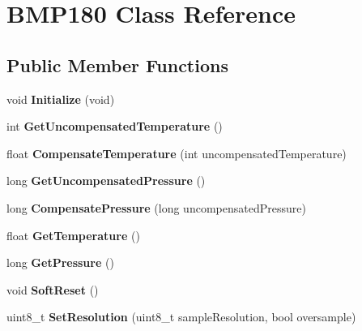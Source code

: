 \hypertarget{class_b_m_p180}{}\section{B\+M\+P180 Class Reference}
\label{class_b_m_p180}
\subsection*{Public Member Functions}
\begin{DoxyCompactItemize}
\item 
\hypertarget{class_b_m_p180_aa0d204ff14f242e7dae7f17616f384b5}{}void {\bfseries Initialize} (void)\label{class_b_m_p180_aa0d204ff14f242e7dae7f17616f384b5}

\item 
\hypertarget{class_b_m_p180_a25efcc78a47f50bb416252dd6589c5b2}{}int {\bfseries Get\+Uncompensated\+Temperature} ()\label{class_b_m_p180_a25efcc78a47f50bb416252dd6589c5b2}

\item 
\hypertarget{class_b_m_p180_aaa9d85bd4b3e01ed5f8145672ebd11b0}{}float {\bfseries Compensate\+Temperature} (int uncompensated\+Temperature)\label{class_b_m_p180_aaa9d85bd4b3e01ed5f8145672ebd11b0}

\item 
\hypertarget{class_b_m_p180_aeffb6785b31ee9cc4c22e66341d61985}{}long {\bfseries Get\+Uncompensated\+Pressure} ()\label{class_b_m_p180_aeffb6785b31ee9cc4c22e66341d61985}

\item 
\hypertarget{class_b_m_p180_a0a6ea646db93f926d7883f2c48d69f90}{}long {\bfseries Compensate\+Pressure} (long uncompensated\+Pressure)\label{class_b_m_p180_a0a6ea646db93f926d7883f2c48d69f90}

\item 
\hypertarget{class_b_m_p180_a57b06b78699af8789354f0a3788d540a}{}float {\bfseries Get\+Temperature} ()\label{class_b_m_p180_a57b06b78699af8789354f0a3788d540a}

\item 
\hypertarget{class_b_m_p180_a332e20330d5a0a82b7a92c928b828651}{}long {\bfseries Get\+Pressure} ()\label{class_b_m_p180_a332e20330d5a0a82b7a92c928b828651}

\item 
\hypertarget{class_b_m_p180_af0b57d651f198db167085a3728f9b2a8}{}void {\bfseries Soft\+Reset} ()\label{class_b_m_p180_af0b57d651f198db167085a3728f9b2a8}

\item 
\hypertarget{class_b_m_p180_aa70a022147dac9c4c70a69e5412c057d}{}uint8\+\_\+t {\bfseries Set\+Resolution} (uint8\+\_\+t sample\+Resolution, bool oversample)\label{class_b_m_p180_aa70a022147dac9c4c70a69e5412c057d}


\end{DoxyCompactItemize}
